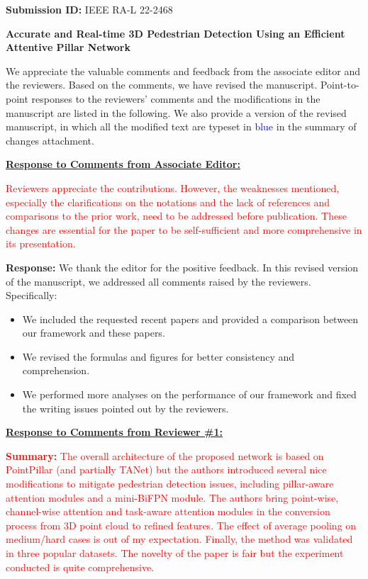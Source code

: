 \documentclass[11pt]{article}
\begin{document}
{\Large
\textbf{Submission ID:} IEEE RA-L 22-2468

\textbf{Accurate and Real-time 3D Pedestrian Detection Using an Efficient Attentive Pillar Network}
}


\vspace{15pt}
We appreciate the valuable comments and feedback from the associate editor and the reviewers. Based on the comments, we have revised the manuscript. Point-to-point responses to the reviewers' comments and the modifications in the manuscript are listed in the following. We also provide a version of the revised manuscript, in which all the modified text are typeset in \textcolor{blue}{blue} in the summary of changes attachment.

\vspace{20pt}
\underline{\textbf{Response to Comments from Associate Editor:}}

\textcolor{red}{Reviewers appreciate the contributions. However, the weaknesses
mentioned, especially the clarifications on the notations and the lack
of references and comparisons to the prior work, need to be addressed
before publication. These changes are essential for the paper to be
self-sufficient and more comprehensive in its presentation.}

\textbf{Response:} We thank the editor for the positive feedback. In this revised version of the manuscript, we addressed all comments raised by the reviewers. Specifically:

\begin{itemize}
    \item We included the requested recent papers and provided a comparison between our framework and these papers.
    \item We revised the formulas and figures for better consistency and comprehension.
    \item We performed more analyses on the performance of our framework and fixed the writing issues pointed out by the reviewers.
    
\end{itemize}


\vspace{20pt}
\underline{\textbf{Response to Comments from Reviewer \#1:}}

\textcolor{red}{\textbf{Summary:} The overall architecture of the proposed network is based on PointPillar (and
partially TANet) but the authors introduced several nice modifications to
mitigate pedestrian detection issues, including pillar-aware attention
modules and a mini-BiFPN module.
The authors bring point-wise, channel-wise attention and task-aware attention
modules in the conversion process from 3D point cloud to refined features.
The effect of average pooling on medium/hard cases is out of my expectation.
Finally, the method was validated in three popular datasets. The novelty of
the paper is fair but the experiment conducted is quite comprehensive.}
\end{document}
